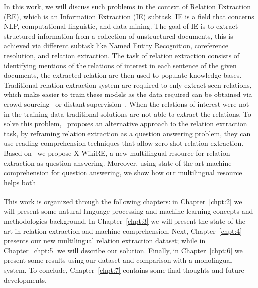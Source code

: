 In this work, we will discuss such problems in the context of Relation Extraction (RE), which is an Information Extraction (IE) subtask. IE is a field that concerns NLP, computational linguistic, and data mining. The goal of IE is to extract structured information from a collection of unstructured documents, this is achieved via different subtask like Named Entity Recognition, coreference resolution, and relation extraction. The task of relation extraction consists of identifying mentions of the relations of interest in each sentence of the given documents, the extracted relation are then used to populate knowledge bases. Traditional relation extraction system are required to only extract seen relations, which make easier to train these models as the data required can be obtained via crowd sourcing~\citep{liu-etal-2016-effective} or distant supervision~\citep{hoffmann-etal-2011-knowledge}. When the relations of interest were not in the training data traditional solutions are not able to extract the relations. To solve this problem,~\cite{levy2017zero} proposes an alternative approach to the relation extraction task, by reframing relation extraction as a question answering problem, they can use reading comprehension techniques that allow zero-shot relation extraction. 
Based on~\citep{levy2017zero, hewlett2016wikireading} we propose X-WikiRE, a new multilingual resource for relation extraction as question answering. Moreover, using state-of-the-art machine comprehension for question answering, we show how our multilingual resource helps both




\paragraph{}
This work is organized through the following chapters: in Chapter~\ref{chpt:2} we will present some natural language processing and machine learning concepts and methodologies background. In Chapter~\ref{chpt:3} we will present the state of the art in relation extraction and machine comprehension. Next, Chapter~\ref{chpt:4} presents our new multilingual relation extraction dataset; while in Chapter~\ref{chpt:5} we will describe our solution. Finally, in Chapter~\ref{chpt:6} we present some results using our dataset and comparison with a monolingual system. To conclude, Chapter~\ref{chpt:7} contains some final thoughts and future developments.